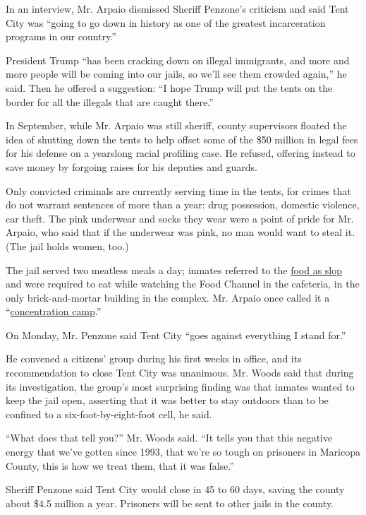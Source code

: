 In an interview, Mr. Arpaio dismissed Sheriff Penzone's criticism and
said Tent City was ``going to go down in history as one of the greatest
incarceration programs in our country.''

President Trump ``has been cracking down on illegal immigrants, and more
and more people will be coming into our jails, so we'll see them crowded
again,'' he said. Then he offered a suggestion: ``I hope Trump will put
the tents on the border for all the illegals that are caught there.''

In September, while Mr. Arpaio was still sheriff, county supervisors
floated the idea of shutting down the tents to help offset some of the
\$50 million in legal fees for his defense on a yearslong racial
profiling case. He refused, offering instead to save money by forgoing
raises for his deputies and guards.

Only convicted criminals are currently serving time in the tents, for
crimes that do not warrant sentences of more than a year: drug
possession, domestic violence, car theft. The pink underwear and socks
they wear were a point of pride for Mr. Arpaio, who said that if the
underwear was pink, no man would want to steal it. (The jail holds
women, too.)

The jail served two meatless meals a day; inmates referred to the
\href{https://www.facebook.com/ThisIsFernanda/videos/vb.656347072/10153670451937073/?type=2\&theater}{food
as slop} and were required to eat while watching the Food Channel in the
cafeteria, in the only brick-and-mortar building in the complex. Mr.
Arpaio once called it a
``\href{https://www.youtube.com/watch?v=1fj3mRGQ0ow}{concentration
camp}.''

On Monday, Mr. Penzone said Tent City ``goes against everything I stand
for.''

He convened a citizens' group during his first weeks in office, and its
recommendation to close Tent City was unanimous. Mr. Woods said that
during its investigation, the group's most surprising finding was that
inmates wanted to keep the jail open, asserting that it was better to
stay outdoors than to be confined to a six-foot-by-eight-foot cell, he
said.

``What does that tell you?'' Mr. Woods said. ``It tells you that this
negative energy that we've gotten since 1993, that we're so tough on
prisoners in Maricopa County, this is how we treat them, that it was
false.''

Sheriff Penzone said Tent City would close in 45 to 60 days, saving the
county about \$4.5 million a year. Prisoners will be sent to other jails
in the county.

